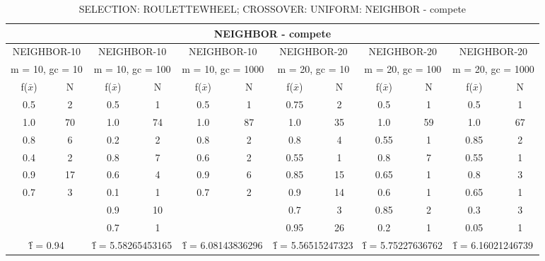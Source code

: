 \begin{table}[H]
	\centering
	\caption{SELECTION: ROULETTEWHEEL; CROSSOVER: UNIFORM: NEIGHBOR - compete}
	\begin{adjustbox}{width=1\textwidth}
		\begin{tabular}{ |c|c||c|c||c|c||c|c||c|c||c|c| }
			\hline
			\multicolumn{12}{|c|}{NEIGHBOR - compete} \\
			\hline
			\multicolumn{2}{|c||}{NEIGHBOR-10} & \multicolumn{2}{c||}{NEIGHBOR-10} & \multicolumn{2}{c||}{NEIGHBOR-10} & \multicolumn{2}{c||}{NEIGHBOR-20} & \multicolumn{2}{c||}{NEIGHBOR-20} & \multicolumn{2}{c|}{NEIGHBOR-20}\\
			\hline
			\multicolumn{2}{|c||}{m = 10, gc = 10} & \multicolumn{2}{c||}{m = 10, gc = 100} & \multicolumn{2}{c||}{m = 10, gc = 1000} & \multicolumn{2}{c||}{m = 20, gc = 10} & \multicolumn{2}{c||}{m = 20, gc = 100} & \multicolumn{2}{c|}{m = 20, gc = 1000}\\
			\hline
			f($\bar{x}$) & N & f($\bar{x}$) & N & f($\bar{x}$) & N & f($\bar{x}$) & N & f($\bar{x}$) & N & f($\bar{x}$) & N\\
			\hline
			\hline
			0.5 & 2 & 0.5 & 1 & 0.5 & 1 & 0.75 & 2 & 0.5 & 1 & 0.5 & 1\\
			1.0 & 70 & 1.0 & 74 & 1.0 & 87 & 1.0 & 35 & 1.0 & 59 & 1.0 & 67\\
			0.8 & 6 & 0.2 & 2 & 0.8 & 2 & 0.8 & 4 & 0.55 & 1 & 0.85 & 2\\
			0.4 & 2 & 0.8 & 7 & 0.6 & 2 & 0.55 & 1 & 0.8 & 7 & 0.55 & 1\\
			0.9 & 17 & 0.6 & 4 & 0.9 & 6 & 0.85 & 15 & 0.65 & 1 & 0.8 & 3\\
			0.7 & 3 & 0.1 & 1 & 0.7 & 2 & 0.9 & 14 & 0.6 & 1 & 0.65 & 1\\
			&   & 0.9 & 10 &   &   & 0.7 & 3 & 0.85 & 2 & 0.3 & 3\\
			&   & 0.7 & 1 &   &   & 0.95 & 26 & 0.2 & 1 & 0.05 & 1\\
			\hline
			\multicolumn{2}{|c||}{\^{f} = 0.94} & \multicolumn{2}{c||}{\^{f} = 5.58265453165} & \multicolumn{2}{c||}{\^{f} = 6.08143836296} & \multicolumn{2}{c||}{\^{f} = 5.56515247323} & \multicolumn{2}{c||}{\^{f} = 5.75227636762} & \multicolumn{2}{c|}{\^{f} = 6.16021246739}\\
			\hline
		\end{tabular}
	\end{adjustbox}
\end{table}
